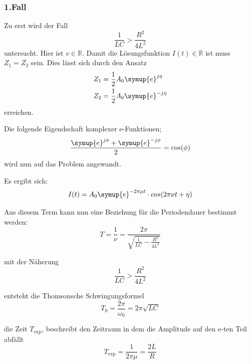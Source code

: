         \subsubsection{1.Fall}
        Zu erst wird der Fall
        \begin{equation}
            \frac{1}{LC} > \frac{R^2}{4L^2}  \nonumber
        \end{equation}
        \noindent untersucht. Hier ist $v \in \mathds{R}$. Damit die Lösungsfunktion $I(t) \in \mathds{R}$ ist muss
        $Z_1 = \overline{Z_2}$ sein. Dies lässt sich durch den Ansatz
        \begin{align}
            Z_1 & = \frac{1}{2} A_0 \symup{e}^{j \eta } \nonumber\\
            Z_2 & = \frac{1}{2} A_0 \symup{e}^{-j \eta} \nonumber
        \end{align}
        \noindent erreichen.
        
        \noindent Die folgende Eigendschaft komplexer e-Funktionen;
        \begin{equation}
            \frac{\symup{e}^{j \phi} + \symup{e}^{-j \phi}}{2} = cos(\phi) \nonumber
        \end{equation}
        \noindent wird nun auf das Problem angewandt.

        \noindent Es ergibt sich:
        \begin{equation}
            I(t) = A_0 \symup{e}^{- 2 \pi \mu t} \cdot cos(2\pi \nu t + \eta) \nonumber
        \end{equation}

        \noindent Aus diesem Term kann nun eine Beziehung für die Periodendauer bestimmt werden:
        \begin{equation}
            T = \frac{1}{\nu} = \frac{2 \pi}{\sqrt{\frac{1}{LC}-\frac{R^2}{4L^2}}} \nonumber
        \end{equation}

        \noindent mit der Näherung
        \begin{equation}
            \frac{1}{LC} > \frac{R^2}{4L^2} \nonumber
        \end{equation}

        \noindent entsteht die Thomsonsche Schwingungsformel
        \begin{equation}
            T_0 = \frac{2\pi}{\omega_0} = 2\pi \sqrt{LC} \nonumber
        \end{equation}

        \noindent die Zeit $T_{\text{exp}}$, beschreibt den Zeitraum in dem die Amplitude auf den e-ten Teil abfällt
        \begin{equation}
            T_{\text{exp}} = \frac{1}{2 \pi \mu } = \frac{2L}{R} \nonumber
        \end{equation}

